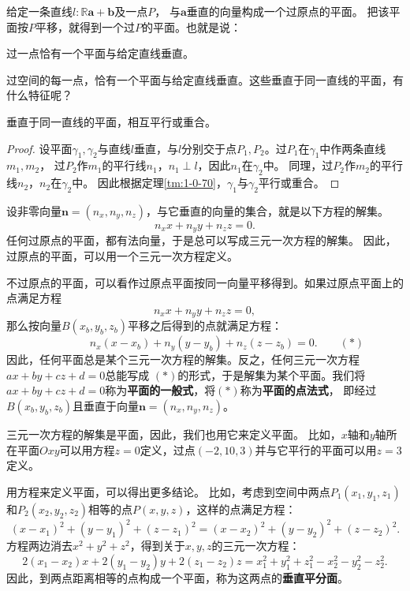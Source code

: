 \documentclass[12pt,UTF8,fontset=none]{ctexbook}
\begin{document}
给定一条直线$l:\mathbb{R}\mathbf{a} + \mathbf{b}$及一点$P$，
与$\mathbf{a}$垂直的向量构成一个过原点的平面。
把该平面按$P$平移，就得到一个过$P$的平面。也就是说：
\begin{tm}\label{tm:1-3-70}
    过一点恰有一个平面与给定直线垂直。
\end{tm}

过空间的每一点，恰有一个平面与给定直线垂直。这些垂直于同一直线的平面，有什么特征呢？
\begin{tm}\label{tm:1-3-80}
    垂直于同一直线的平面，相互平行或重合。
\end{tm}
\begin{proof}
    设平面$\gamma_1,\gamma_2$与直线$l$垂直，与$l$分别交于点$P_1,P_2$。过$P_1$在$\gamma_1$中作两条直线$m_1,m_2$，
    过$P_2$作$m_1$的平行线$n_1$，$n_1\perp l$，因此$n_1$在$\gamma_2$中。
    同理，过$P_2$作$m_2$的平行线$n_2$，$n_2$在$\gamma_2$中。
    因此根据定理\ref{tm:1-0-70}，$\gamma_1$与$\gamma_2$平行或重合。
\end{proof}

设非零向量$\mathbf{n} = (n_x, n_y, n_z)$，与它垂直的向量的集合，就是以下方程的解集。
$$ n_xx + n_yy + n_zz = 0. $$
任何过原点的平面，都有法向量，于是总可以写成三元一次方程的解集。
因此，过原点的平面，可以用一个三元一次方程定义。

不过原点的平面，可以看作过原点平面按同一向量平移得到。如果过原点平面上的点满足方程
$$ n_xx + n_yy + n_zz = 0, $$
那么按向量$B(x_b, y_b,z_b)$平移之后得到的点就满足方程：
$$ \mbox{}\qquad\qquad n_x(x - x_b) + n_y(y - y_b) + n_z(z - z_b) = 0. \quad\quad (*)$$
因此，任何平面总是某个三元一次方程的解集。反之，任何三元一次方程$ax+by+cz+d = 0$总能写成
$(*)$的形式，于是解集为某个平面。我们将$ax+by+cz+d = 0$称为\textbf{平面的一般式}，将$(*)$称为\textbf{平面的点法式}，
即经过$B(x_b, y_b,z_b)$且垂直于向量$\mathbf{n} = (n_x, n_y, n_z)$。

三元一次方程的解集是平面，因此，我们也用它来定义平面。
比如，$x$轴和$y$轴所在平面$Oxy$可以用方程$z = 0$定义，过点$(-2,10,3)$并与它平行的平面可以用$z = 3$定义。	

用方程来定义平面，可以得出更多结论。
比如，考虑到空间中两点$P_1(x_1, y_1, z_1)$和$P_2(x_2, y_2, z_2)$相等的点$P(x,y,z)$，这样的点满足方程：
$$ (x - x_1)^2 + (y - y_1)^2 + (z - z_1)^2 = (x - x_2)^2 + (y - y_2)^2 + (z - z_2)^2. $$
方程两边消去$x^2 + y^2 + z^2$，得到关于$x,y,z$的三元一次方程：
$$ 2(x_1-x_2)x + 2(y_1-y_2)y + 2(z_1-z_2)z = x_1^2+y_1^2+z_1^2 - x_2^2-y_2^2-z_2^2. $$
因此，到两点距离相等的点构成一个平面，称为这两点的\textbf{垂直平分面}。
\end{document}
